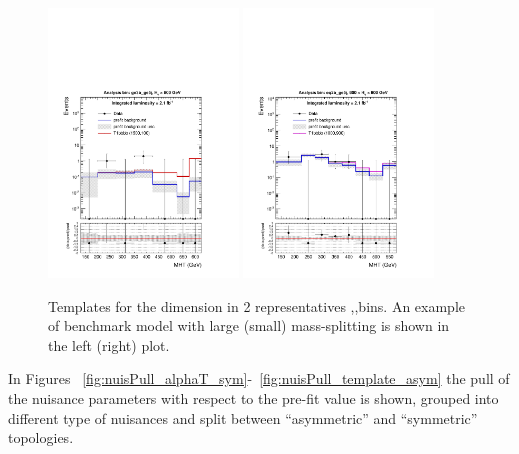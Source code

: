\begin{figure}[tbhp]
    \caption{ Templates for the \mht dimension in 2 representatives \njet,\nb,\scalht bins. An example of benchmark model with large (small) mass-splitting is shown in the left (right) plot. \label{fig:mht-templates} }
  \begin{center}
    \includegraphics[width=0.45\textwidth]{figures/postFitResults/preFitShapes_withSig/postFitShape_ge3b_ge5j_800_Inf_prefit_uncompressed} \hspace{1cm}
    \includegraphics[width=0.45\textwidth]{figures/postFitResults/preFitShapes_withSig/postFitShape_eq2b_ge5j_600_800_prefit_compressed} \\
  \end{center}
\end{figure}

In Figures ~\ref{fig:nuisPull_alphaT_sym}-~\ref{fig:nuisPull_template_asym} the pull of the nuisance parameters with respect to the pre-fit value is shown, 
grouped into different type of nuisances and split between ``asymmetric'' and ``symmetric'' topologies.

